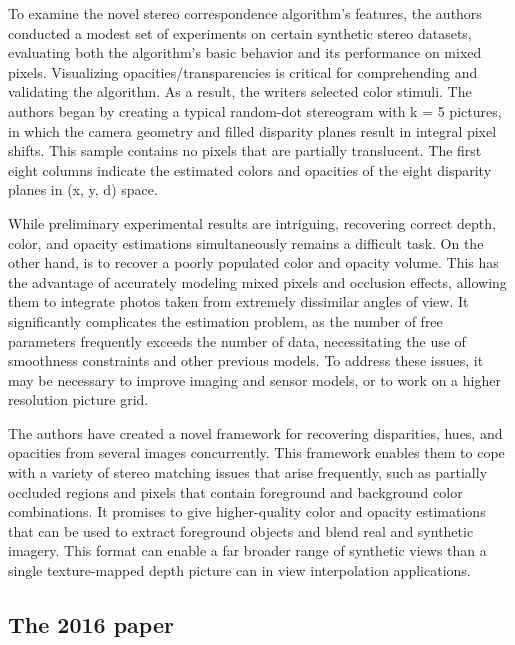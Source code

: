 To examine the novel stereo correspondence algorithm's features, the authors conducted a modest set of experiments on certain synthetic stereo datasets, evaluating both the algorithm's basic behavior and its performance on mixed pixels. Visualizing opacities/transparencies is critical for comprehending and validating the algorithm. As a result, the writers selected color stimuli. The authors began by creating a typical random-dot stereogram with k = 5 pictures, in which the camera geometry and filled disparity planes result in integral pixel shifts. This sample contains no pixels that are partially translucent. The first eight columns indicate the estimated colors and opacities of the eight disparity planes in (x, y, d) space.

While preliminary experimental results are intriguing, recovering correct depth, color, and opacity estimations simultaneously remains a difficult task. On the other hand, is to recover a poorly populated color and opacity volume. This has the advantage of accurately modeling mixed pixels and occlusion effects, allowing them to integrate photos taken from extremely dissimilar angles of view. It significantly complicates the estimation problem, as the number of free parameters frequently exceeds the number of data, necessitating the use of smoothness constraints and other previous models. To address these issues, it may be necessary to improve imaging and sensor models, or to work on a higher resolution picture grid.

The authors have created a novel framework for recovering disparities, hues, and opacities from several images concurrently. This framework enables them to cope with a variety of stereo matching issues that arise frequently, such as partially occluded regions and pixels that contain foreground and background color combinations. It promises to give higher-quality color and opacity estimations that can be used to extract foreground objects and blend real and synthetic imagery. This format can enable a far broader range of synthetic views than a single texture-mapped depth picture can in view interpolation applications.

 \subsection{The 2016 paper}\label{subsec2:2016}

